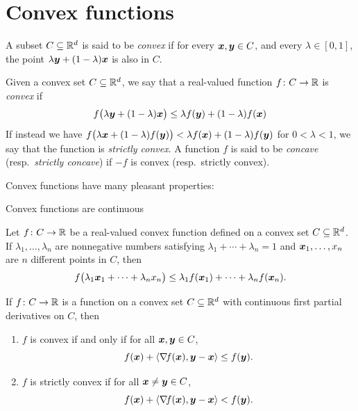 \section{Convex functions}
\begin{definition}\label{def:convexSets}
A subset $C \subseteq \mathbb{R}^d$ is said to be \emph{convex} if for every $\boldsymbol{x}, \boldsymbol{y} \in C$, and every $\lambda \in [0,1]$, the point $\lambda \boldsymbol{y} + (1-\lambda) \boldsymbol{x}$ is also in $C$.
\end{definition}

\begin{definition}\label{def:ConvexFunctions}
Given a convex set $C \subseteq \mathbb{R}^d$, we say that a real-valued function $f \colon C \to \mathbb{R}$ is \emph{convex} if 
\begin{equation*}
f\big(\lambda \boldsymbol{y} + (1-\lambda)\boldsymbol{x} \big) \leq \lambda f(\boldsymbol{y}) + (1-\lambda) f(\boldsymbol{x})
\end{equation*}
If instead we have $f\big(\lambda \boldsymbol{x} + (1-\lambda)f(\boldsymbol{y})\big) < \lambda f(\boldsymbol{x}) + (1-\lambda) f(\boldsymbol{y})$ for $0<\lambda<1$, we say that the function is \emph{strictly convex}.  A function $f$ is said to be \emph{concave} (resp.~\emph{strictly concave}) if $-f$ is convex (resp.~strictly convex).
\end{definition}
Convex functions have many pleasant properties:
\begin{theorem}\label{theorem:ConvexIsContinuous}
Convex functions are continuous
\end{theorem}

\begin{theorem}
Let $f\colon C \to \mathbb{R}$ be a real-valued convex function defined on a convex set $C \subseteq \mathbb{R}^d$.  If $\lambda_1, \dotsc, \lambda_n$ are nonnegative numbers satisfying $\lambda_1 + \dotsb + \lambda_n = 1$ and $\boldsymbol{x}_1, \dotsc, x_n$ are $n$ different points in $C$, then
\begin{equation*}
f\big( \lambda_1 \boldsymbol{x}_1 + \dotsb + \lambda_n x_n \big) \leq \lambda_1 f(\boldsymbol{x}_1) + \dotsb + \lambda_n f(\boldsymbol{x}_n).
\end{equation*}
\end{theorem}

\begin{theorem}\label{theorem:convexAboveTangentHyperplane}
If $f\colon C \to \mathbb{R}$ is a function on a convex set $C \subseteq \mathbb{R}^d$ with continuous first partial derivatives on $C$, then
\begin{enumerate}
	\item $f$ is convex if and only if for all $\boldsymbol{x}, \boldsymbol{y} \in C$,
	\begin{equation*}
	f(\boldsymbol{x}) + \langle \mathop{\nabla\! {f}}(\boldsymbol{x}), \boldsymbol{y} - \boldsymbol{x} \rangle \leq f(\boldsymbol{y}).
	\end{equation*}
	\item $f$ is strictly convex if for all $\boldsymbol{x} \neq \boldsymbol{y} \in C$,
	\begin{equation*}
	f(\boldsymbol{x}) + \langle \mathop{\nabla\! {f}}(\boldsymbol{x}), \boldsymbol{y} - \boldsymbol{x} \rangle < f(\boldsymbol{y}).
	\end{equation*}
\end{enumerate}
\end{theorem}

